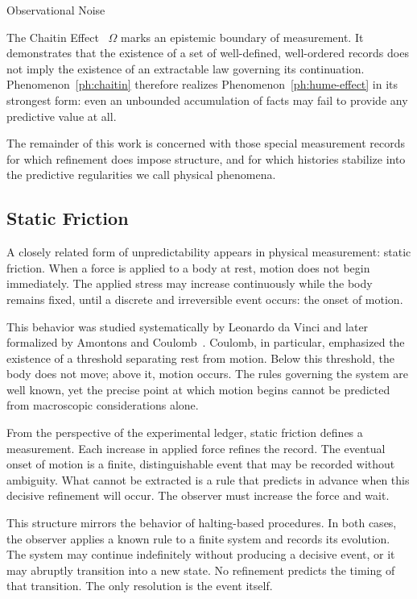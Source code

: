 \begin{coda}{Observational Noise}
\begin{phenom}{The Chaitin Effect~\cite{chaitin1975}}
\PhConsequence
$\Omega$ marks an epistemic boundary of measurement. It demonstrates that the
existence of a set of well-defined, well-ordered records does not imply the
existence of an extractable law governing its continuation. Phenomenon~\ref{ph:chaitin} 
therefore realizes Phenomenon~\ref{ph:hume-effect} in its strongest form: even an unbounded
accumulation of facts may fail to provide any predictive value at all.
\end{phenom}

The remainder of this
work is concerned with those special measurement records for which refinement
does impose structure, and for which histories stabilize into the
predictive regularities we call physical phenomena.


\subsection*{Static Friction}

A closely related form of unpredictability appears in physical measurement:
static friction. When a
force is applied to a body at rest, motion does not begin immediately. The
applied stress may increase continuously while the body remains fixed, until
a discrete and irreversible event occurs: the onset of motion.

This behavior was studied systematically by Leonardo da Vinci and later
formalized by Amontons and Coulomb~\cite{amontons1699,davinci1493,coulomb1785}. 
Coulomb, in particular, emphasized the
existence of a threshold separating rest from motion. Below this threshold,
the body does not move; above it, motion occurs. The rules governing the
system are well known, yet the precise point at which motion begins cannot be
predicted from macroscopic considerations alone.

From the perspective of the experimental ledger, static friction defines a
measurement. Each increase in applied force refines the record.
The eventual onset of motion is a finite, distinguishable event that may be
recorded without ambiguity. What cannot be extracted is a rule that predicts
in advance when this decisive refinement will occur. The observer must
increase the force and wait.

This structure mirrors the behavior of halting-based procedures. In both
cases, the observer applies a known rule to a finite system and records its
evolution. The system may continue indefinitely without producing a decisive
event, or it may abruptly transition into a new state. No 
refinement predicts the timing of that transition. The only resolution is the
event itself.


\end{coda}
